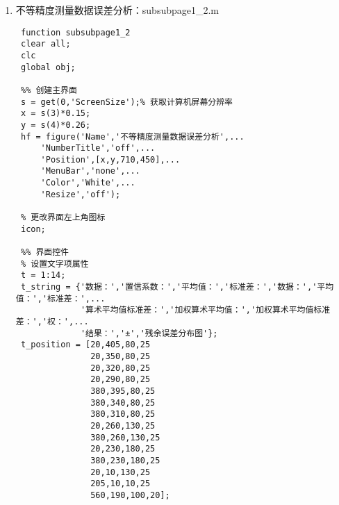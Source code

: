 \begin{enumerate}
\begin{lstlisting}
 function run1(a,b)
 global obj;
 s1 = str2num(get(obj(18),'String'));
 s2 = str2num(get(obj(17),'String'));
 if isempty(s1)||isempty(s2)
 	warndlg('缺少输入参数！');
 	return;
 end
 [data1,v1,a,a1,s,s1,s1_x,x] = data_process1(s1,s2);
 result = {x(2),x(1),s1_x,s1,a1,data1,s,a};
 axes(obj(2));
 plot(v1,'-o');
 for i = 9:16
     set(obj(i),'String',result{i-8});
 end
 
 function imp(a,b)
 global data_cell;
 global obj;
 [FileName,PathName,FilterIndex] = uigetfile(...
     {'*.txt','Text Data Files(*.txt)';...
      '*.xls','Excel 工作薄(*.xls)'});
 if FileName==0
     return;
 end
 if FilterIndex==1
 	data = load(strcat(PathName,FileName));
 else
 	data = xlsread(strcat(PathName,FileName));
 end
 s = size(data);
 data_cell = cell(s(1),1);
 for i = 1:s(1)
 	a = data(i,:);
 	a(isnan(a)) = [];
 	data_cell{i} = a;
 end
 tip = '数据1';
 for i=2:(s(1))
 	tip = strcat(tip,'|数据',num2str(i));
 end
 set(obj(3),'String',tip);
 set(obj(18),'String',data_cell{1});
 msgbox('导入成功','提示','warn');
 
 function outp(a,b)
 global obj;
 header = {'数据','置信系数','平均值','标准差','剔除粗大误差后平均值',...
 '剔除粗大误差 后标准差','算术平均值标准差','结果'};
 n = [17:-1:15 13:-1:9];
 for i = 1:length(n)
     str{i} = num2str(get(obj(n(i)),'String'));
 end
 a = num2str(get(obj(3),'Value'));
 values = {strcat('数据',a),str{1:6},strcat(str{7},'±',str{8})};
 xlswrite(strcat(datestr(now,30),'.xls'),[header;values]);
 msgbox('保存成功','提示','warn');\end{lstlisting}
	\item 不等精度测量数据误差分析：subsubpage1\_2.m
	\begin{lstlisting}
 function subsubpage1_2
 clear all;
 clc
 global obj;
 
 %% 创建主界面
 s = get(0,'ScreenSize');% 获取计算机屏幕分辨率
 x = s(3)*0.15;
 y = s(4)*0.26;
 hf = figure('Name','不等精度测量数据误差分析',...
     'NumberTitle','off',...
     'Position',[x,y,710,450],...
     'MenuBar','none',...
     'Color','White',...
     'Resize','off');
 
 % 更改界面左上角图标
 icon;
 
 %% 界面控件
 % 设置文字项属性
 t = 1:14;
 t_string = {'数据：','置信系数：','平均值：','标准差：','数据：','平均值：','标准差：',...
 			 '算术平均值标准差：','加权算术平均值：','加权算术平均值标准差：','权：',...
			 '结果：','±','残余误差分布图'};
 t_position = [20,405,80,25
               20,350,80,25
               20,320,80,25
               20,290,80,25
               380,395,80,25
               380,340,80,25
               380,310,80,25
               20,260,130,25
               380,260,130,25
               20,230,180,25
               380,230,180,25
               20,10,130,25
               205,10,10,25
               560,190,100,20];
 

\end{lstlisting}
\end{enumerate}
